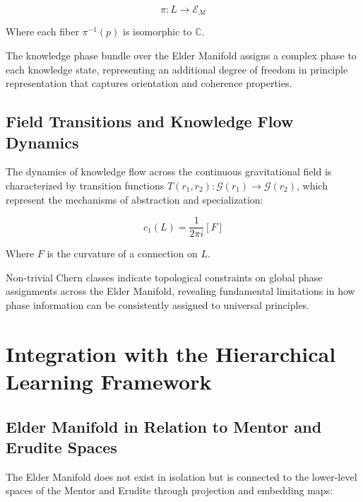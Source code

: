 \begin{equation}
\pi: L \rightarrow \mathcal{E}_{\mathcal{M}}
\end{equation}

Where each fiber $\pi^{-1}(p)$ is isomorphic to $\mathbb{C}$.

\begin{definition}
The knowledge phase bundle over the Elder Manifold assigns a complex phase to each knowledge state, representing an additional degree of freedom in principle representation that captures orientation and coherence properties.
\end{definition}

\subsection{Field Transitions and Knowledge Flow Dynamics}

The dynamics of knowledge flow across the continuous gravitational field is characterized by transition functions $T(r_1, r_2): \mathcal{G}(r_1) \rightarrow \mathcal{G}(r_2)$, which represent the mechanisms of abstraction and specialization:

\begin{equation}
c_1(L) = \frac{1}{2\pi i}[F]
\end{equation}

Where $F$ is the curvature of a connection on $L$.

\begin{theorem}
Non-trivial Chern classes indicate topological constraints on global phase assignments across the Elder Manifold, revealing fundamental limitations in how phase information can be consistently assigned to universal principles.
\end{theorem}

\section{Integration with the Hierarchical Learning Framework}

\subsection{Elder Manifold in Relation to Mentor and Erudite Spaces}

The Elder Manifold does not exist in isolation but is connected to the lower-level spaces of the Mentor and Erudite through projection and embedding maps:

